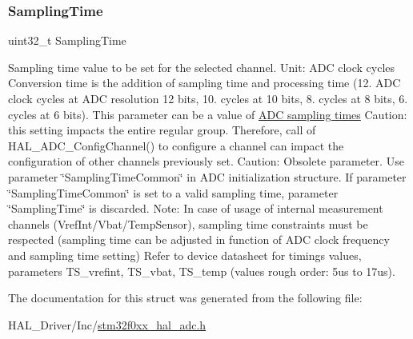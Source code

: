 \subsubsection{\texorpdfstring{Sampling\+Time}{SamplingTime}}
{\footnotesize\ttfamily uint32\+\_\+t Sampling\+Time}

Sampling time value to be set for the selected channel. Unit\+: A\+DC clock cycles Conversion time is the addition of sampling time and processing time (12. A\+DC clock cycles at A\+DC resolution 12 bits, 10. cycles at 10 bits, 8. cycles at 8 bits, 6. cycles at 6 bits). This parameter can be a value of \hyperlink{group___a_d_c__sampling__times}{A\+DC sampling times} Caution\+: this setting impacts the entire regular group. Therefore, call of H\+A\+L\+\_\+\+A\+D\+C\+\_\+\+Config\+Channel() to configure a channel can impact the configuration of other channels previously set. Caution\+: Obsolete parameter. Use parameter \char`\"{}\+Sampling\+Time\+Common\char`\"{} in A\+DC initialization structure. If parameter \char`\"{}\+Sampling\+Time\+Common\char`\"{} is set to a valid sampling time, parameter \char`\"{}\+Sampling\+Time\char`\"{} is discarded. Note\+: In case of usage of internal measurement channels (Vref\+Int/\+Vbat/\+Temp\+Sensor), sampling time constraints must be respected (sampling time can be adjusted in function of A\+DC clock frequency and sampling time setting) Refer to device datasheet for timings values, parameters T\+S\+\_\+vrefint, T\+S\+\_\+vbat, T\+S\+\_\+temp (values rough order\+: 5us to 17us). 

The documentation for this struct was generated from the following file\+:\begin{DoxyCompactItemize}
\item 
H\+A\+L\+\_\+\+Driver/\+Inc/\hyperlink{stm32f0xx__hal__adc_8h}{stm32f0xx\+\_\+hal\+\_\+adc.\+h}\end{DoxyCompactItemize}

